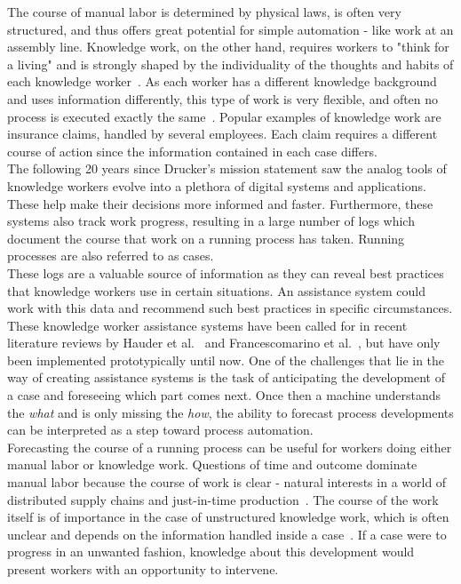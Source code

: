 The course of manual labor is determined by physical laws, is often very structured, and thus offers great potential for simple automation - like work at an assembly line. Knowledge work, on the other hand, requires workers to "think for a living" and is strongly shaped by the individuality of the thoughts and habits of each knowledge worker~\cite{drucker1999}. As each worker has a different knowledge background and uses information differently, this type of work is very flexible, and often no process is executed exactly the same~\cite{hewelt2016}. Popular examples of knowledge work are insurance claims, handled by several employees. Each claim requires a different course of action since the information contained in each case differs.\\

The following 20 years since Drucker's mission statement saw the analog tools of knowledge workers evolve into a plethora of digital systems and applications. These help make their decisions more informed and faster. Furthermore, these systems also track work progress, resulting in a large number of logs which document the course that work on a running process has taken. Running processes are also referred to as cases.\\

These logs are a valuable source of information as they can reveal best practices that knowledge workers use in certain situations. An assistance system could work with this data and recommend such best practices in specific circumstances. These knowledge worker assistance systems have been called for in recent literature reviews by Hauder et al.~\cite{hauder2014} and Francescomarino et al.~\cite{francescomarino2018}, but have only been implemented prototypically until now. One of the challenges that lie in the way of creating assistance systems is the task of anticipating the development of a case and foreseeing which part comes next. Once then a machine understands the \textit{what} and is only missing the \textit{how}, the ability to forecast process developments can be interpreted as a step toward process automation.\\

Forecasting the course of a running process can be useful for workers doing either manual labor or knowledge work. Questions of time and outcome dominate manual labor because the course of work is clear - natural interests in a world of distributed supply chains and just-in-time production~\cite{web:economist:jit}. The course of the work itself is of importance in the case of unstructured knowledge work, which is often unclear and depends on the information handled inside a case~\cite{francescomarino2015}. If a case were to progress in an unwanted fashion, knowledge about this development would present workers with an opportunity to intervene.\\

